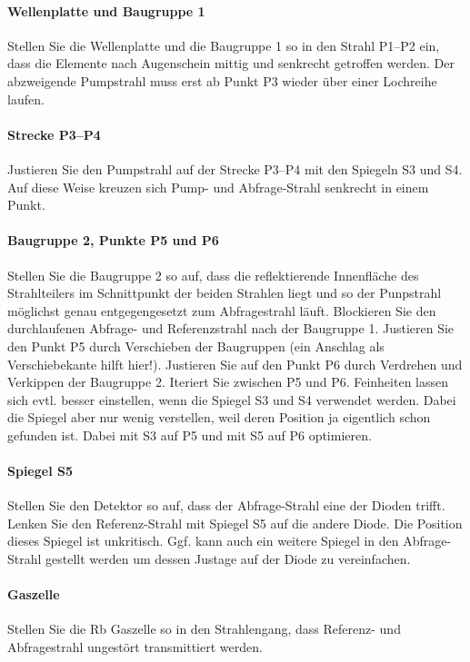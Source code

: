 \paragraph{Wellenplatte und Baugruppe 1}  Stellen Sie die Wellenplatte und die Baugruppe 1 so in den Strahl P1--P2 ein, dass die Elemente nach Augenschein mittig und senkrecht getroffen werden.  Der abzweigende Pumpstrahl muss erst ab Punkt P3 wieder über einer Lochreihe laufen.

\paragraph{Strecke P3--P4} Justieren Sie den Pumpstrahl auf der Strecke P3--P4 mit den Spiegeln S3 und S4. Auf diese Weise kreuzen sich Pump- und Abfrage-Strahl senkrecht in einem Punkt.

\paragraph{Baugruppe 2, Punkte P5 und P6}  Stellen Sie  die Baugruppe 2 so auf, dass die reflektierende Innenfläche des Strahlteilers im Schnittpunkt der beiden Strahlen liegt und so der Punpstrahl möglichst genau entgegengesetzt zum  Abfragestrahl läuft. Blockieren Sie den durchlaufenen Abfrage- und Referenzstrahl nach der Baugruppe 1. Justieren Sie den Punkt P5 durch Verschieben der Baugruppen (ein Anschlag als Verschiebekante hilft hier!). Justieren Sie auf den Punkt P6 durch Verdrehen und Verkippen der Baugruppe 2. Iteriert Sie zwischen P5 und P6. Feinheiten lassen sich evtl. besser einstellen, wenn die Spiegel S3 und S4 verwendet werden. Dabei die Spiegel aber nur wenig verstellen, weil deren Position ja eigentlich schon gefunden ist. Dabei mit S3 auf P5 und mit S5 auf P6 optimieren.


\paragraph{Spiegel S5} Stellen Sie den Detektor so auf, dass der Abfrage-Strahl eine der Dioden trifft. Lenken Sie den Referenz-Strahl mit Spiegel S5 auf die andere Diode.
 Die Position dieses Spiegel ist unkritisch.  Ggf. kann auch ein weitere Spiegel in den Abfrage-Strahl gestellt werden um dessen Justage auf der Diode zu vereinfachen.

\paragraph{Gaszelle} Stellen Sie die Rb Gaszelle so in den Strahlengang, dass Referenz- und Abfragestrahl ungestört transmittiert werden.


